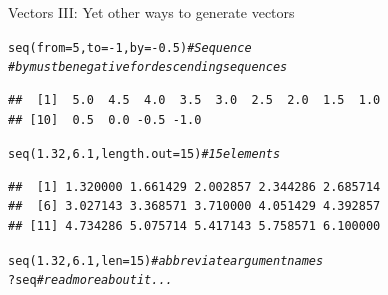 \documentclass[xcolor=table,       handout,    xcolor=dvipsnames]{beamer}\usepackage[]{graphicx}\usepackage[]{color}
\makeatletter
\newcommand{\hlnum}[1]{\textcolor[rgb]{0,0,0}{#1}}
\newcommand{\hlcom}[1]{\textcolor[rgb]{0,0.392,0}{\textit{#1}}}
\newcommand{\hlopt}[1]{\textcolor[rgb]{0,0,0}{#1}}
\newcommand{\hlstd}[1]{\textcolor[rgb]{0,0,0}{#1}}
\newcommand{\hlkwc}[1]{\textcolor[rgb]{1,0,1}{#1}}
\newcommand{\hlkwd}[1]{\textcolor[rgb]{0,0,1}{#1}}
\newenvironment{kframe}{%
 \def\at@end@of@kframe{}%
 \ifinner\ifhmode%
  \def\at@end@of@kframe{\end{minipage}}%
  \begin{minipage}{\columnwidth}%
 \fi\fi%
 \def\FrameCommand##1{\hskip\@totalleftmargin \hskip-\fboxsep
 \colorbox{shadecolor}{##1}\hskip-\fboxsep
     \hskip-\linewidth \hskip-\@totalleftmargin \hskip\columnwidth}%
 \MakeFramed {\advance\hsize-\width
   \@totalleftmargin\z@ \linewidth\hsize
   \@setminipage}}%
 {\par\unskip\endMakeFramed%
 \at@end@of@kframe}
\newenvironment{knitrout}{}{} %
\makeatother
\begin{document}
\begin{frame}[fragile]{Vectors III: Yet other ways to generate vectors}
\pause
\begin{knitrout}
\color{fgcolor}\begin{kframe}
\begin{alltt}
\hlkwd{seq}\hlstd{(}\hlkwc{from}\hlstd{=}\hlnum{5}\hlstd{,} \hlkwc{to}\hlstd{=}\hlopt{-}\hlnum{1}\hlstd{,} \hlkwc{by}\hlstd{=}\hlopt{-}\hlnum{0.5}\hlstd{)} \hlcom{# Sequence}
\hlcom{# by must be negative for descending sequences}
\end{alltt}
\begin{verbatim}
##  [1]  5.0  4.5  4.0  3.5  3.0  2.5  2.0  1.5  1.0
## [10]  0.5  0.0 -0.5 -1.0
\end{verbatim}
\end{kframe}
\end{knitrout}
\begin{knitrout}
\color{fgcolor}\begin{kframe}
\begin{alltt}
\hlkwd{seq}\hlstd{(}\hlnum{1.32}\hlstd{,} \hlnum{6.1}\hlstd{,} \hlkwc{length.out}\hlstd{=}\hlnum{15}\hlstd{)} \hlcom{# 15 elements}
\end{alltt}
\begin{verbatim}
##  [1] 1.320000 1.661429 2.002857 2.344286 2.685714
##  [6] 3.027143 3.368571 3.710000 4.051429 4.392857
## [11] 4.734286 5.075714 5.417143 5.758571 6.100000
\end{verbatim}
\end{kframe}
\end{knitrout}
\begin{knitrout}
\color{fgcolor}\begin{kframe}
\begin{alltt}
\hlkwd{seq}\hlstd{(}\hlnum{1.32}\hlstd{,} \hlnum{6.1}\hlstd{,} \hlkwc{len}\hlstd{=}\hlnum{15}\hlstd{)} \hlcom{# abbreviate argument names}
\hlopt{?}\hlstd{seq} \hlcom{# read more about it...}
\end{alltt}
\end{kframe}
\end{knitrout}
\end{frame}

\end{document}
